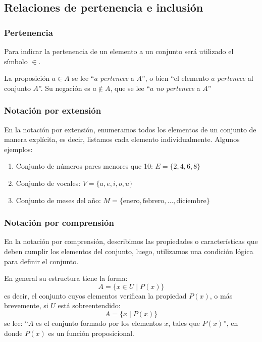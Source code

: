 \subsection{Relaciones de pertenencia e inclusión}

\subsubsection{Pertenencia}

Para indicar la pertenencia de un elemento a un conjunto será utilizado el símbolo $\in$.

La proposición $a \in A$ se lee ``$a$ \textit{pertenece} a $A$'', o bien ``el elemento $a$ \textit{pertenece} al conjunto $A$''. Su negación es $a \not \in A$, que se lee ``$a$ \textit{no pertenece} a $A$''

\subsubsection{Notación por extensión}

En la notación por extensión, enumeramos todos los elementos de un conjunto de manera explícita, es decir, listamos cada elemento individualmente. Algunos ejemplos:

\begin{enumerate}
	\item Conjunto de números pares menores que 10: $E = \{2, 4, 6, 8\}$
	\item Conjunto de vocales: \(V = \{a, e, i, o, u\}\)
	
	\item Conjunto de meses del año: \(M = \{\text{enero}, \text{febrero}, \ldots, \text{diciembre}\}\)
\end{enumerate}

\subsubsection{Notación por comprensión}

En la notación por comprensión, describimos las propiedades o características que deben cumplir los elementos del conjunto, luego, utilizamos una condición lógica para definir el conjunto.

En general su estructura tiene la forma:
\[ A = \{ x \in U \mid P(x) \}\]
es decir, el conjunto cuyos elementos verifican la propiedad $P(x)$, o más brevemente, si $U$ está sobreentendido:
\[ A = \{ x \mid P(x) \}\]
se lee: ``$A$ es el conjunto formado por los elementos $x$, tales que $P(x)$'', en donde $P(x)$ es un función proposicional.

